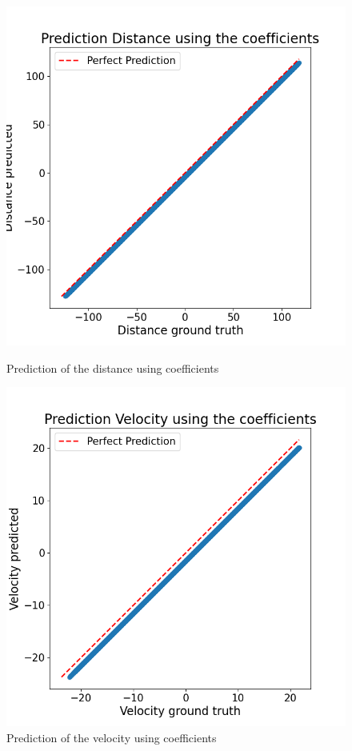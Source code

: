 \begin{figure}[htbp]
    \centering
    \begin{minipage}[b]{0.45\columnwidth}
        \centering
        \includegraphics[width=\columnwidth]{images/figures/Prediction Distance using the coefficients.png}
        \caption{Prediction of the distance using coefficients}
        \label{fig:minipage3}
    \end{minipage}
    \hfill
    \begin{minipage}[b]{0.45\columnwidth}
        \centering
        \includegraphics[width=\columnwidth]{images/figures/Prediction Velocity using the coefficients.png}
        \caption{Prediction of the velocity using coefficients}
        \label{fig:minipage4}
    \end{minipage}
    \label{fig:combined_figure_2}
\end{figure}

